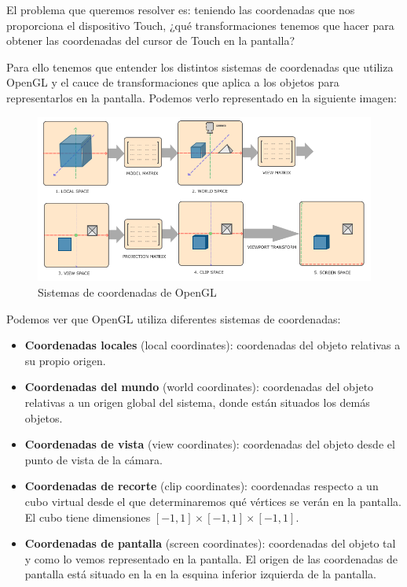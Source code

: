 \documentclass[a4paper,11pt, oneside]{book}
\begin{document}
El problema que queremos resolver es: teniendo las coordenadas que nos proporciona el dispositivo Touch, ¿qué transformaciones tenemos que hacer para obtener las coordenadas del cursor de Touch en la pantalla?


Para ello tenemos que entender los distintos sistemas de coordenadas que utiliza OpenGL y el cauce de transformaciones que aplica a los objetos para representarlos en la pantalla. Podemos verlo representado en la siguiente imagen:
\begin{figure}[H]
	
	\centering
	\includegraphics[width=\linewidth]{coordinate_systems}
	\caption{Sistemas de coordenadas de OpenGL}
	\label{fig:figura1}
	
\end{figure}


Podemos ver que OpenGL utiliza diferentes sistemas de coordenadas:
\begin{itemize}
	\item \textbf{Coordenadas locales} (local coordinates): coordenadas del objeto relativas a su propio origen.
	\item \textbf{Coordenadas del mundo} (world coordinates): coordenadas del objeto relativas a un origen global del sistema, donde están situados los demás objetos.
	\item \textbf{Coordenadas de vista} (view coordinates): coordenadas del objeto desde el punto de vista de la cámara.
	\item \textbf{Coordenadas de recorte} (clip coordinates): coordenadas respecto a un cubo virtual desde el que determinaremos qué vértices se verán en la pantalla. El cubo tiene dimensiones $[-1,1]\times [-1,1]\times [-1,1]$.
	\item \textbf{Coordenadas de pantalla} (screen coordinates): coordenadas del objeto tal y como lo vemos representado en la pantalla. El origen de las coordenadas de pantalla está situado en la en la esquina inferior izquierda de la pantalla.
\end{itemize} 
\end{document}
